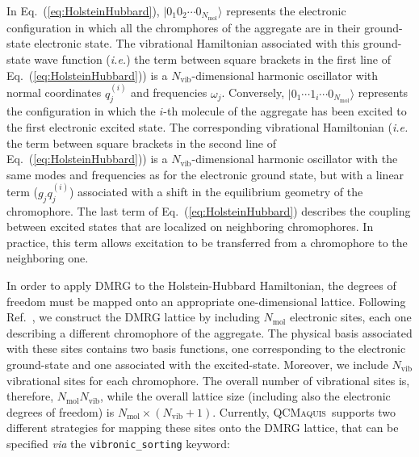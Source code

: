 \documentclass[bibliography=totoc,12pt,a4paper]{scrartcl}
\newcommand{\qcm}{\textsc{QCMaquis}}
\begin{document}
In Eq.~(\ref{eq:HolsteinHubbard}), $| 0_1 0_2 \cdots 0_{N_\text{mol}} \rangle$ represents the electronic configuration in which all the chromphores of the aggregate are in their ground-state electronic state.
The vibrational Hamiltonian associated with this ground-state wave function (\textit{i.e.}) the term between square brackets in the first line of Eq.~(\ref{eq:HolsteinHubbard})) is a $N_\text{vib}$-dimensional harmonic oscillator with normal coordinates $q_{j}^{(i)}$ and frequencies $\omega_j$.
Conversely, $| 0_1 \cdots 1_i \cdots 0_{N_\text{mol}} \rangle$ represents the configuration in which the $i$-th molecule of the aggregate has been excited to the first electronic excited state.
The corresponding vibrational Hamiltonian (\textit{i.e.} the term between square brackets in the second line of Eq.~(\ref{eq:HolsteinHubbard})) is a $N_\text{vib}$-dimensional harmonic oscillator with the same modes and frequencies as for the electronic ground state, but with a linear term ($g_j q_{j}^{(i)}$) associated with a shift in the equilibrium geometry of the chromophore.
The last term of Eq.~(\ref{eq:HolsteinHubbard}) describes the coupling between excited states that are localized on neighboring chromophores.
In practice, this term allows excitation to be transferred from a chromophore to the neighboring one.

In order to apply DMRG to the Holstein-Hubbard Hamiltonian, the degrees of freedom must be mapped onto an appropriate one-dimensional lattice.
Following Ref.~, we construct the DMRG lattice by including $N_\text{mol}$ electronic sites, each one describing a different chromophore of the aggregate.
The physical basis associated with these sites contains two basis functions, one corresponding to the electronic ground-state and one associated with the excited-state.
Moreover, we include $N_\text{vib}$ vibrational sites for each chromophore.
The overall number of vibrational sites is, therefore, $N_\text{mol} N_\text{vib}$, while the overall lattice size (including also the electronic degrees of freedom) is $N_\text{mol} \times (N_\text{vib}+1)$.
Currently, \qcm\ supports two different strategies for mapping these sites onto the DMRG lattice, that can be specified \textit{via} the \texttt{vibronic\_sorting} keyword:
\end{document}
